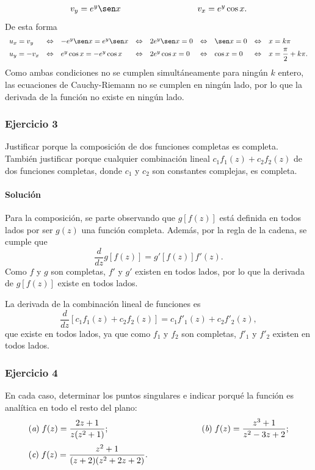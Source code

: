 \documentclass[a4paper]{report}
\begin{document}
\begin{enumerate}
\[\begin{array}{ll}
  v_y=e^y\sen x\qquad\qquad\qquad\qquad&v_x=e^y\cos x.
 \end{array}
 \]
 De esta forma
 \[
 \begin{array}{lllllllll}
  u_x=v_y&\Leftrightarrow&-e^y\sen x=e^y\sen x&\Leftrightarrow&2e^y\sen x=0&\Leftrightarrow&\sen x=0&\Leftrightarrow&x=k\pi\\[\smallskipamount]
  u_y=-v_x&\Leftrightarrow&e^y\cos x=-e^y\cos x&\Leftrightarrow&2e^y\cos x=0&\Leftrightarrow&\cos x=0&\Leftrightarrow&x=\dfrac{\pi}{2}+k\pi.
 \end{array}
 \] 
 Como ambas condiciones no se cumplen simultáneamente para ningún \(k\) entero, las ecuaciones de Cauchy-Riemann no se cumplen en ningún lado, por lo que la derivada de la función no existe en ningún lado. 
\end{enumerate}

\subsubsection{Ejercicio 3}

Justificar porque la composición de dos funciones completas es completa. También justificar porque cualquier combinación lineal \(c_1f_1(z)+c_2f_2(z)\) de dos funciones completas, donde \(c_1\) y \(c_2\) son constantes complejas, es completa.

\paragraph{Solución} Para la composición, se parte observando que \(g[f(z)]\) está definida en todos lados por ser \(g(z)\) una función completa. Además, por la regla de la cadena, se cumple que
\[
 \frac{d}{dz}g[f(z)]=g'[f(z)]f'(z).
\]
Como \(f\) y \(g\) son completas, \(f'\) y \(g'\) existen en todos lados, por lo que la derivada de \(g[f(z)]\) existe en todos lados.

La derivada de la combinación lineal de funciones es 
\[
 \frac{d}{dz}[c_1f_1(z)+c_2f_2(z)]=c_1f'_1(z)+c_2f'_2(z),
\]
que existe en todos lados, ya que como \(f_1\) y \(f_2\) son completas, \(f'_1\) y \(f'_2\) existen en todos lados. 

\subsubsection{Ejercicio 4}

En cada caso, determinar los puntos singulares e indicar porqué la función es analítica en todo el resto del plano:
\[
 \begin{array}{ll}
  (\textit{a})\;f(z)=\dfrac{2z+1}{z(z^2+1)};\qquad\qquad\qquad\qquad\qquad&(\textit{b})\;f(z)=\dfrac{z^3+1}{z^2-3z+2};\\[\bigskipamount]
  (\textit{c})\;f(z)=\dfrac{z^2+1}{(z+2)(z^2+2z+2)}.
 \end{array}
\]
\end{document}
